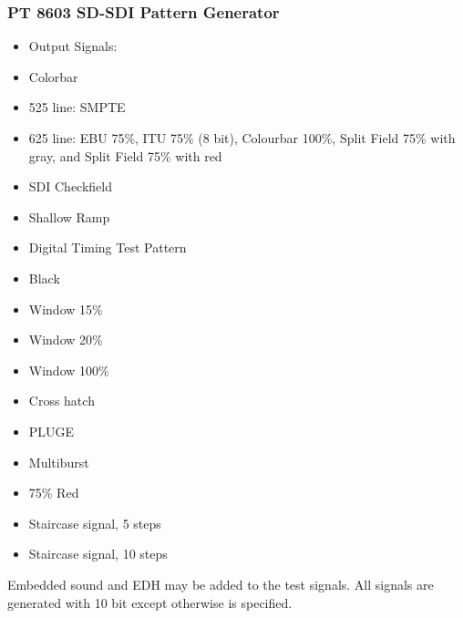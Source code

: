 \subsubsection{PT 8603 SD-SDI Pattern Generator}

\begin{itemize}
	\setlength{\itemsep}{1pt}
	\setlength{\parskip}{0pt}

	\item Output Signals:
	\item[ ] Colorbar
	\item[ ] 525 line: SMPTE
	\item[ ] 625 line: EBU 75\%, ITU 75\% (8 bit), Colourbar 100\%, Split Field 75\% with gray, and Split Field 75\% with red
	\item SDI Checkfield
	\item Shallow Ramp
	\item Digital Timing Test Pattern
	\item Black
	\item Window 15\%
	\item Window 20\%
	\item Window 100\%
	\item Cross hatch
	\item PLUGE
	\item Multiburst
	\item 75\% Red
	\item Staircase signal, 5 steps
	\item Staircase signal, 10 steps
\end{itemize}

Embedded sound and EDH may be added to the test signals.
All signals are generated with 10 bit except otherwise is specified.